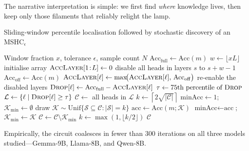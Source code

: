 \documentclass{article}
\begin{document}
The narrative interpretation is simple: we first find \emph{where} knowledge
lives, then keep only those filaments that reliably relight the lamp.
\begin{algorithm}[t]
\caption{Sliding‑window percentile localisation followed by stochastic discovery of an MSHC${}_{\epsilon}$}
\label{alg:mshc}
\begin{algorithmic}[1]
\Require Window fraction $x$, tolerance $\epsilon$, sample count $N$
\State $\mathrm{Acc}_{\mathrm{full}}\gets\mathrm{Acc}(m)$
\State $w\gets\lfloor xL\rfloor$
\State initialise array $\textsc{AccLayer}[1\!:\!L]\gets 0$ 
    \State disable all heads in layers $s$ to $s+w-1$
    \State $\mathrm{Acc}_{\mathrm{off}}\gets\mathrm{Acc}(m)$
        \State $\textsc{AccLayer}[\ell]\gets\max\!\bigl(\textsc{AccLayer}[\ell],\,\mathrm{Acc}_{\mathrm{off}}\bigr)$
    \EndFor
    \State re‑enable the disabled layers
\EndFor
\State {}
    \State $\textsc{Drop}[\ell]\gets\mathrm{Acc}_{\mathrm{full}} - \textsc{AccLayer}[\ell]$
\EndFor
\State $\tau\gets\text{75th percentile of }\textsc{Drop}$
\State $\mathcal{L}\gets\{\ell\;|\;\textsc{Drop}[\ell]\ge\tau\}$ 
\State $\mathcal{C}\gets$ all heads in $\mathcal{L}$ 
\State $k\gets\left\lceil 2\sqrt{|\mathcal C|}\right\rceil$
    \Repeat
        \State $\text{minAcc}\gets 1$; $\mathcal K_{\mathrm{min}}\gets\emptyset$
            \State draw $\mathcal K\!\sim\!\mathrm{Unif}\{\mathcal S\subseteq\mathcal C:|\mathcal S|=k\}$
            \State $\text{acc}\gets\mathrm{Acc}(m;\mathcal K)$
                \State $\text{minAcc}\gets\text{acc}$; $\mathcal K_{\mathrm{min}}\gets\mathcal K$
            \EndIf
        \EndFor
            \State $\mathcal C\gets\mathcal C\setminus\mathcal K_{\mathrm{min}}$ 
        \EndIf
    \State $k\gets\max(1,\lfloor k/2\rfloor)$
\EndWhile
\State\Return $\mathcal C$
\end{algorithmic}
\end{algorithm}

Empirically, the circuit coalesces in fewer than 300 iterations on all three
models studied—Gemma-9B, Llama-8B, and Qwen-8B.
\end{document}
